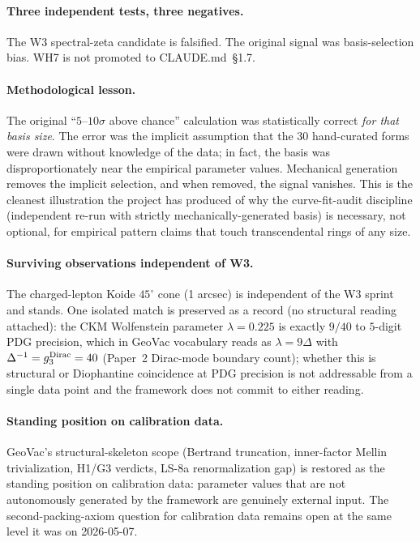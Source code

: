 \documentclass[11pt]{article}
\begin{document}
\paragraph{Three independent tests, three negatives.}
The W3 spectral-zeta candidate is falsified.  The original signal was
basis-selection bias.  WH7 is not promoted to CLAUDE.md~\S 1.7.

\paragraph{Methodological lesson.}
The original ``$5$--$10\sigma$ above chance'' calculation was
statistically correct \emph{for that basis size}.  The error was the
implicit assumption that the 30 hand-curated forms were drawn without
knowledge of the data; in fact, the basis was disproportionately near
the empirical parameter values.  Mechanical generation removes the
implicit selection, and when removed, the signal vanishes.  This is
the cleanest illustration the project has produced of why the
curve-fit-audit discipline (independent re-run with strictly
mechanically-generated basis) is necessary, not optional, for
empirical pattern claims that touch transcendental rings of any
size.

\paragraph{Surviving observations independent of W3.}
The charged-lepton Koide $45^\circ$ cone (1 arcsec) is independent of
the W3 sprint and stands.  One isolated match is preserved as a
record (no structural reading attached): the CKM Wolfenstein
parameter $\lambda = 0.225$ is exactly $9/40$ to $5$-digit PDG
precision, which in GeoVac vocabulary reads as $\lambda = 9\Delta$
with $\Delta^{-1} = g_3^{\rm Dirac} = 40$ (Paper~2 Dirac-mode
boundary count); whether this is structural or Diophantine
coincidence at PDG precision is not addressable from a single data
point and the framework does not commit to either reading.

\paragraph{Standing position on calibration data.}
GeoVac's structural-skeleton scope (Bertrand truncation, inner-factor
Mellin trivialization, H1/G3 verdicts, LS-8a renormalization gap)
is restored as the standing position on calibration data: parameter
values that are not autonomously generated by the framework are
genuinely external input.  The second-packing-axiom question for
calibration data remains open at the same level it was on
2026-05-07.
\end{document}
